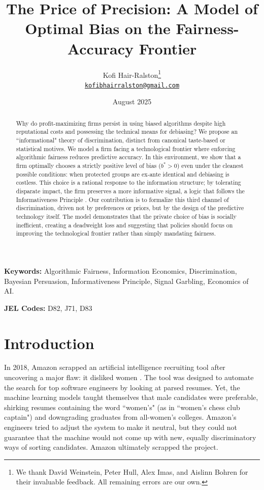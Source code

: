 \documentclass[12pt,a4paper]{article}
\title{The Price of Precision: A Model of Optimal Bias on the Fairness-Accuracy Frontier}
\date{August 2025}
\author{
    Kofi Hair-Ralston\thanks{We thank David Weinstein, Peter Hull, Alex Imas, and Aislinn Bohren for their invaluable feedback. All remaining errors are our own.}\\
  \texttt{\href{mailto:kofibhairralston@gmail.com}{kofibhairralston@gmail.com}}
}
\theoremstyle{definition}
\theoremstyle{remark}
\begin{document}
\maketitle


\begin{abstract}
    \noindent Why do profit-maximizing firms persist in using biased algorithms despite high reputational costs and possessing the technical means for debiasing? We propose an ``informational" theory of discrimination, distinct from canonical taste-based \citep{Becker1957} or statistical \citep{Phelps1972, Arrow1973} motives. We model a firm facing a technological frontier where enforcing algorithmic fairness reduces predictive accuracy. In this environment, we show that a firm optimally chooses a strictly positive level of bias ($b^* > 0$) even under the cleanest possible conditions: when protected groups are ex-ante identical and debiasing is costless. This choice is a rational response to the information structure; by tolerating disparate impact, the firm preserves a more informative signal, a logic that follows the Informativeness Principle \citep{Holmstrom1979}. Our contribution is to formalize this third channel of discrimination, driven not by preferences or priors, but by the design of the predictive technology itself. The model demonstrates that the private choice of bias is socially inefficient, creating a deadweight loss and suggesting that policies should focus on improving the technological frontier rather than simply mandating fairness.
    
\end{abstract}

\vspace{0.5cm}
\noindent\textbf{Keywords:} Algorithmic Fairness, Information Economics, Discrimination, Bayesian Persuasion, Informativeness Principle, Signal Garbling, Economics of AI.
\vspace{0.3cm}

\noindent\textbf{JEL Codes:} D82, J71, D83


\newpage

\section{Introduction}

In 2018, Amazon scrapped an artificial intelligence recruiting tool after uncovering a major flaw: it disliked women \citep{Dastin2018}. The tool was designed to automate the search for top software engineers by looking at parsed resumes. Yet, the machine learning models taught themselves that male candidates were preferable, shirking resumes containing the word ``women's" (as in ``women's chess club captain") and downgrading graduates from all-women's colleges. Amazon's engineers tried to adjust the system to make it neutral, but they could not guarantee that the machine would not come up with new, equally discriminatory ways of sorting candidates. Amazon ultimately scrapped the project.
\end{document}
